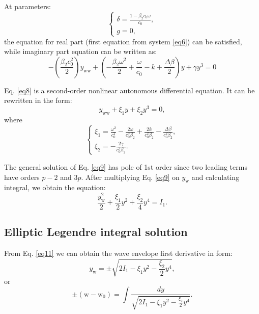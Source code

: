 \documentclass{article}
\begin{document}
At parameters:
\begin{equation} \label{eq7}
    \begin{cases}
    \displaystyle \delta = \frac{1-\beta_{2} c_{0} \omega}{c_{0}},\\
    \displaystyle g = 0,
    \end{cases}
\end{equation}
the equation for real part (first equation from system \ref{eq6}) can be satisfied, while imaginary part equation can be written as:
\begin{equation} \label{eq8}
    -\left(\frac{\beta_{2} c_{0}^{2}}{2} \right)y_{\mathrm{ww}} + \left(-\frac{\beta_{2} \omega^{2}}{2}+\frac{\omega}{c_{0}}-k +\frac{\Delta \beta}{2}\right) y + \gamma  y^{3} =0
\end{equation}

Eq. \ref{eq8} is a second-order nonlinear autonomous differential equation. It can be rewritten in the form:
\begin{equation} \label{eq9}
    y_{\mathrm{ww}} + \xi_{1} y + \xi_{2} y^3 = 0,
\end{equation}
where
\begin{equation} \label{eq10}
    \begin{cases}
    \displaystyle \xi_{1} = 
        \frac{\omega^{2}}{c_{0}^{2}}
        -\frac{2 \omega}{c_{0}^{3} \beta_{2}}
        +\frac{2 k}{c_{0}^{2} \beta_{2}}
        -\frac{\Delta \beta}{c_{0}^{2} \beta_{2}},\\
    \displaystyle \xi_{2} = -\frac{2 \gamma}{c_{0}^{2} \beta_{2}}.
    \end{cases}
\end{equation}

The general solution of Eq. \ref{eq9} has pole of 1st order since two leading terms have orders \(p-2\) and \(3p\). After multiplying Eq. \ref{eq9} on \(y_{\mathrm{w}}\) and calculating integral, we obtain the equation:
\begin{equation} \label{eq11}
    \frac{y^2_{\mathrm{w}}}{2} + \frac{\xi_{1}}{2} y^2 + \frac{\xi_{2}}{4} y^4 = I_{1}.
\end{equation}

\subsection{Elliptic Legendre integral solution}
From Eq. \ref{eq11} we can obtain the wave envelope first derivative in form:
\begin{equation} \label{eq12}
    y_{\mathrm{w}} = \pm \sqrt{2I_{1} - \xi_{1}y^2-\frac{\xi_{2}}{2}y^4},
\end{equation}
or
\begin{equation} \label{eq13}
    \pm \left(\mathrm{w} - \mathrm{w}_{0}\right) = \int \frac{dy}{ \sqrt{2I_{1} - \xi_{1}y^2-\frac{\xi_{2}}{2}y^4}}.
\end{equation}
\end{document}
